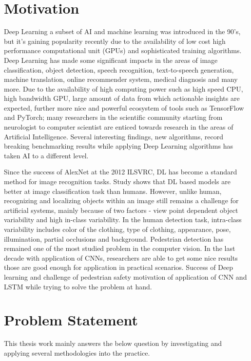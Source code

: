 \section{Motivation}
Deep Learning a subset of AI and machine learning was introduced in the 90's, but it's gaining  popularity recently due to the availability of low cost high performance computational unit (GPUs) and sophisticated training algorithms. Deep Learning has made some significant impacts in the areas of image classification, 
object detection, speech recognition, text-to-speech generation, machine translation,
online recommender system, medical diagnosis and many more. Due to the availability of high 
computing power such as high speed CPU, high bandwidth GPU, large amount of 
data from which actionable insights are expected, further more nice and powerful ecosystem of  
tools such as TensorFlow and PyTorch; many researchers in the scientific community 
starting from neurologist to computer scientist are enticed towards research in the areas 
of Artificial Intelligence. Several interesting findings, new algorithms, record 
breaking benchmarking results while applying Deep Learning algorithms has taken 
AI to a different level. 

\newpara 

\newpara Since the success of AlexNet at the 2012 ILSVRC, DL has become a standard method for image recognition tasks. Study shows that DL based models are better at image classification task than humans. However, unlike human, recognizing and localizing objects within an image still remains a challenge for artificial 
systems, mainly because of two factors - view point dependent object variability and
high in-class variability. In the human detection task, intra-class variability includes
color of the clothing, type of clothing, appearance, pose, illumination, partial occlusions
and background. Pedestrian detection has remained one of the most studied problem in the computer vision.
In the last decade with application of CNNs, researchers are able to get some nice results 
those are good enough for application in practical scenarios. Success of Deep learning and challenge of pedestrian safety motivation of application of CNN and LSTM while trying to solve the problem at hand.

\section{Problem Statement }
This thesis work mainly answers the below question by investigating and  applying several methodologies into the practice. 

